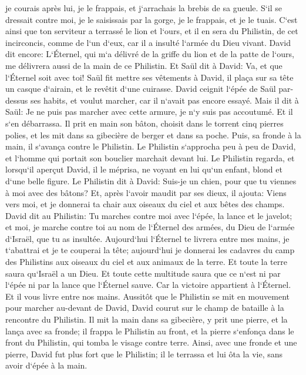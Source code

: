 \verse je courais après lui, je le frappais, et j`arrachais la brebis de sa gueule. S`il se dressait contre moi, je le saisissais par la gorge, je le frappais, et je le tuais. 
\verse C`est ainsi que ton serviteur a terrassé le lion et l`ours, et il en sera du Philistin, de cet incirconcis, comme de l`un d`eux, car il a insulté l`armée du Dieu vivant. 
\verse David dit encore: L`Éternel, qui m`a délivré de la griffe du lion et de la patte de l`ours, me délivrera aussi de la main de ce Philistin. Et Saül dit à David: Va, et que l`Éternel soit avec toi! 
\verse Saül fit mettre ses vêtements à David, il plaça sur sa tête un casque d`airain, et le revêtit d`une cuirasse. 
\verse David ceignit l`épée de Saül par-dessus ses habits, et voulut marcher, car il n`avait pas encore essayé. Mais il dit à Saül: Je ne puis pas marcher avec cette armure, je n`y suis pas accoutumé. Et il s`en débarrassa. 
\verse Il prit en main son bâton, choisit dans le torrent cinq pierres polies, et les mit dans sa gibecière de berger et dans sa poche. Puis, sa fronde à la main, il s`avança contre le Philistin. 
\verse Le Philistin s`approcha peu à peu de David, et l`homme qui portait son bouclier marchait devant lui. 
\verse Le Philistin regarda, et lorsqu`il aperçut David, il le méprisa, ne voyant en lui qu`un enfant, blond et d`une belle figure. 
\verse Le Philistin dit à David: Suis-je un chien, pour que tu viennes à moi avec des bâtons? Et, après l`avoir maudit par ses dieux, 
\verse il ajouta: Viens vers moi, et je donnerai ta chair aux oiseaux du ciel et aux bêtes des champs. 
\verse David dit au Philistin: Tu marches contre moi avec l`épée, la lance et le javelot; et moi, je marche contre toi au nom de l`Éternel des armées, du Dieu de l`armée d`Israël, que tu as insultée. 
\verse Aujourd`hui l`Éternel te livrera entre mes mains, je t`abattrai et je te couperai la tête; aujourd`hui je donnerai les cadavres du camp des Philistins aux oiseaux du ciel et aux animaux de la terre. Et toute la terre saura qu`Israël a un Dieu. 
\verse Et toute cette multitude saura que ce n`est ni par l`épée ni par la lance que l`Éternel sauve. Car la victoire appartient à l`Éternel. Et il vous livre entre nos mains. 
\verse Aussitôt que le Philistin se mit en mouvement pour marcher au-devant de David, David courut sur le champ de bataille à la rencontre du Philistin. 
\verse Il mit la main dans sa gibecière, y prit une pierre, et la lança avec sa fronde; il frappa le Philistin au front, et la pierre s`enfonça dans le front du Philistin, qui tomba le visage contre terre. 
\verse Ainsi, avec une fronde et une pierre, David fut plus fort que le Philistin; il le terrassa et lui ôta la vie, sans avoir d`épée à la main. 

